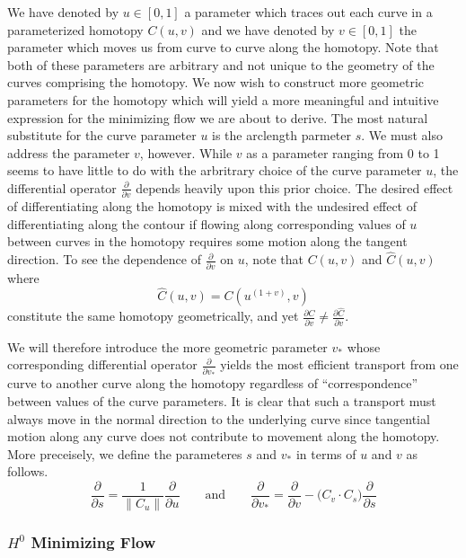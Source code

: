 \documentclass[twoside,a4paper,english]{article}
\def\v{{v_*}}
\newcommand\pderiv[2][]{\frac{\partial #1}{\partial #2}}
\begin{document}
We have denoted by $u\in[0,1]$ a parameter which traces out
each curve in a parameterized homotopy $C(u,v)$ and we have denoted
by $v\in[0,1]$ the parameter which moves us from curve to curve
along the homotopy. Note that both of these parameters are arbitrary
and not unique to the geometry of the curves comprising the homotopy.
We now wish to construct more geometric parameters for the homotopy
which will yield a more meaningful and intuitive expression for the
minimizing flow we are about to derive. The most natural substitute
for the curve parameter $u$ is the arclength parmeter $s$. We must
also address the parameter $v$, however. While
$v$ as a parameter ranging from 0 to 1 seems to have little to do
with the arbritrary choice of the curve parameter $u$,
the differential operator $\pderiv{v}$ depends heavily upon this
prior choice. The desired effect of differentiating along the homotopy
is mixed with the undesired effect of differentiating along the contour
if flowing along corresponding values of $u$ between curves in the
homotopy requires some motion along the tangent direction.
To see the dependence of $\pderiv{v}$ on $u$, note that $C(u,v)$ and
$\hat{C}(u,v)$ where
$$\hat{C}(u,v)=C\left(u^{(1+v)},v\right)$$
constitute the same homotopy geometrically,
and yet $\pderiv[C]{v}\ne\pderiv[\hat{C}]{v}$.

We will therefore introduce the more geometric parameter $\v$ whose
corresponding differential operator $\pderiv{\v}$ yields the most
efficient transport from one curve to another curve along the homotopy
regardless of ``correspondence'' between values of the curve parameters.
It is clear that such a transport must always move in the normal direction
to the underlying curve since tangential motion along any curve does not
contribute to movement along the homotopy. More preceisely, we define
the parameteres $s$ and $\v$ in terms of $u$ and $v$ as follows.
$$
\pderiv{s}=\frac{1}{\|C_u\|}\pderiv{u} \qquad\mbox{and}\qquad
\pderiv{\v}=\pderiv{v}-\big(C_v\cdot C_s\big) \pderiv{s}
$$


\subsubsection{$H^0$ Minimizing Flow}
\end{document}
